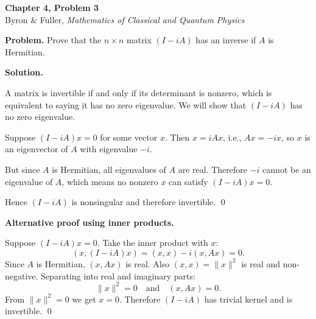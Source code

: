 \documentclass[12pt]{article}
\begin{document}
\begin{center}
{\Large\bfseries Chapter 4, Problem 3}\\[6pt]
Byron \& Fuller, \textit{Mathematics of Classical and Quantum Physics}
\end{center}

\bigskip

\textbf{Problem.} Prove that the $n \times n$ matrix $(I - iA)$ has an inverse if $A$ is Hermitian.

\bigskip
\textbf{Solution.}

A matrix is invertible if and only if its determinant is nonzero, which is equivalent to saying it has no zero eigenvalue. We will show that $(I - iA)$ has no zero eigenvalue.

Suppose $(I - iA)x = 0$ for some vector $x$. Then $x = iAx$, i.e., $Ax = -ix$, so $x$ is an eigenvector of $A$ with eigenvalue $-i$.

But since $A$ is Hermitian, all eigenvalues of $A$ are real. Therefore $-i$ cannot be an eigenvalue of $A$, which means no nonzero $x$ can satisfy $(I - iA)x = 0$.

Hence $(I - iA)$ is nonsingular and therefore invertible. \qed

\bigskip
\textbf{Alternative proof using inner products.}

Suppose $(I - iA)x = 0$. Take the inner product with $x$:
\[
(x, (I - iA)x) = (x, x) - i(x, Ax) = 0.
\]
Since $A$ is Hermitian, $(x, Ax)$ is real. Also $(x, x) = \|x\|^2$ is real and non-negative. Separating into real and imaginary parts:
\[
\|x\|^2 = 0 \quad \text{and} \quad (x, Ax) = 0.
\]
From $\|x\|^2 = 0$ we get $x = 0$. Therefore $(I - iA)$ has trivial kernel and is invertible. \qed
\end{document}
